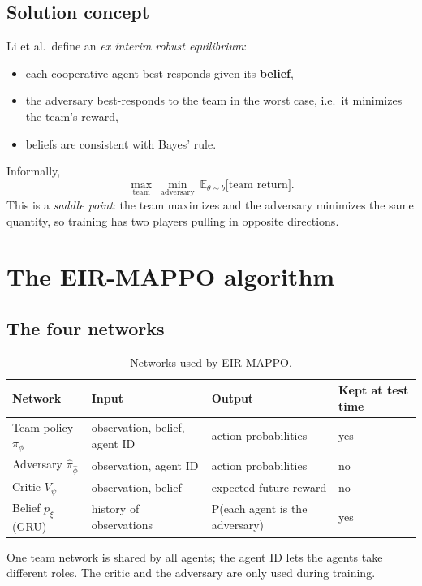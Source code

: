 \documentclass[11pt]{article}
\newcommand{\E}{\mathbb{E}}
\begin{document}
\subsection{Solution concept}
Li et al.\ define an \emph{ex interim robust equilibrium}:
\begin{itemize}
  \item each cooperative agent best-responds given its \textbf{belief},
  \item the adversary best-responds to the team in the worst case, i.e.\ it minimizes the
        team's reward,
  \item beliefs are consistent with Bayes' rule.
\end{itemize}
Informally,
\[
  \max_{\text{team}} \ \min_{\text{adversary}} \ \E_{\theta \sim b}\big[\text{team return}\big].
\]
This is a \emph{saddle point}: the team maximizes and the adversary minimizes the same
quantity, so training has two players pulling in opposite directions.

\section{The EIR-MAPPO algorithm}

\subsection{The four networks}

\begin{table}[h]
  \centering
  \begin{tabular}{@{}llll@{}}
    \toprule
    Network & Input & Output & Kept at test time \\
    \midrule
    Team policy $\pi_\phi$ & observation, belief, agent ID & action probabilities & yes \\
    Adversary $\hat\pi_{\hat\phi}$ & observation, agent ID & action probabilities & no \\
    Critic $V_\psi$ & observation, belief & expected future reward & no \\
    Belief $p_\xi$ (GRU) & history of observations & P(each agent is the adversary) & yes \\
    \bottomrule
  \end{tabular}
  \caption{Networks used by EIR-MAPPO.}
\end{table}

One team network is shared by all agents; the agent ID lets the agents take different
roles. The critic and the adversary are only used during training.
\end{document}
